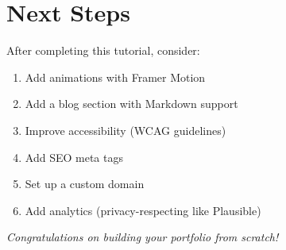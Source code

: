 \documentclass[12pt,a4paper]{article}
\begin{document}
\section{Next Steps}

After completing this tutorial, consider:

\begin{enumerate}
    \item Add animations with Framer Motion
    \item Add a blog section with Markdown support
    \item Improve accessibility (WCAG guidelines)
    \item Add SEO meta tags
    \item Set up a custom domain
    \item Add analytics (privacy-respecting like Plausible)
\end{enumerate}

\vspace{2cm}
\begin{center}
\textit{Congratulations on building your portfolio from scratch!}
\end{center}
\end{document}
